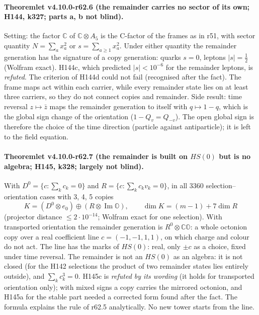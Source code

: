 \paragraph{Theoremlet v4.10.0-r62.6 (the remainder carries no sector of its own; H144, k327; parts a, b not blind).}
Setting: the factor \(\mathbb C\) of \(\mathbb C\otimes A_5\) is the C-factor of the frames as in r51, with sector quantity
\(N=\sum_a x_a^2\) or \(s=\sum_{a\ge1}x_a^2\).  Under either quantity the remainder generation has the signature of a copy generation: quarks
\(s=0\), leptons \(|s|=\tfrac12\) (Wolfram exact).  H144c, which predicted \(|s|<10^{-6}\) for the remainder leptons, is \emph{refuted}.  The
criterion of H144d could not fail (recognised after the fact).  The frame maps act within each carrier, while every remainder state lies on at
least three carriers, so they do not connect copies and remainder.  Side result: time reversal \(z\mapsto\bar z\) maps the remainder generation
to itself with \(q\mapsto1-q\), which is the global sign change of the orientation (\(1-Q_v=Q_{-v}\)).  The open global sign is therefore the
choice of the time direction (particle against antiparticle); it is left to the field equation.

\paragraph{Theoremlet v4.10.0-r62.7 (the remainder is built on \(HS(0)\) but is no algebra; H145, k328; largely not blind).}
With \(D^0=\{c:\sum_kc_k=0\}\) and \(R=\{c:\sum_kc_kv_k=0\}\), in all 3360 selection--orientation cases with 3, 4, 5 copies
\[
K=(D^0\otimes e_0)\oplus(R\otimes\operatorname{Im}\mathbb O),\qquad \dim K=(m-1)+7\dim R
\]
(projector distance \(\le2\cdot10^{-14}\); Wolfram exact for one selection).  With transported orientation the remainder generation is
\(R^0\otimes\mathbb C\mathbb O\): a whole octonion copy over a real coefficient line \(c=(-1,-1,1,1)\), on which charge and colour do not act.
The line has the marks of \(HS(0)\): real, only \(\pm c\) as a choice, fixed under time reversal.  The remainder is not an \(HS(0)\) as an algebra:
it is not closed (for the H142 selections the product of two remainder states lies entirely outside), and \(\sum_kc_k^3=0\).  H145c is
\emph{refuted by its wording} (it holds for transported orientation only); with mixed signs a copy carries the mirrored octonion, and H145a for the
stable part needed a corrected form found after the fact.  The formula explains the rule of r62.5 analytically.  No new tower starts from the line.

